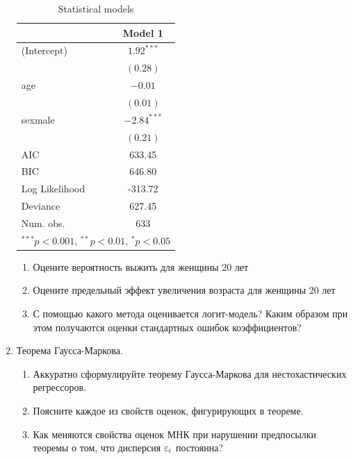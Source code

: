 \documentclass[12pt, a4paper]{article}
\begin{document}
\begin{enumerate}
\begin{table}[h!]
\begin{center}
\begin{tabular}{l c }
\hline
 & Model 1 \\
\hline
(Intercept)    & $1.92^{***}$  \\
               & $(0.28)$      \\
age            & $-0.01$       \\
               & $(0.01)$      \\
sexmale        & $-2.84^{***}$ \\
               & $(0.21)$      \\
\hline
AIC            & 633.45        \\
BIC            & 646.80        \\
Log Likelihood & -313.72       \\
Deviance       & 627.45        \\
Num. obs.      & 633           \\
\hline
\multicolumn{2}{l}{\scriptsize{$^{***}p<0.001$, $^{**}p<0.01$, $^*p<0.05$}}
\end{tabular}
\caption{Statistical models}
\label{table:titanic-2}
\end{center}
\end{table}



\begin{enumerate}
\item Оцените вероятность выжить для женщины 20 лет
\item Оцените предельный эффект увеличения возраста для женщины 20 лет
\item С помощью какого метода оценивается логит-модель? Каким образом при этом получаются оценки стандартных ошибок коэффициентов?
\end{enumerate}


\item Теорема Гаусса-Маркова.

\begin{enumerate}
\item Аккуратно сформулируйте теорему Гаусса-Маркова для нестохастических регрессоров.
\item Поясните каждое из свойств оценок, фигурирующих в теореме.
\item Как меняются свойства оценок МНК при нарушении предпосылки теоремы о том, что дисперсия $\varepsilon_i$ постоянна?
\end{enumerate}


\end{enumerate}
\end{document}
